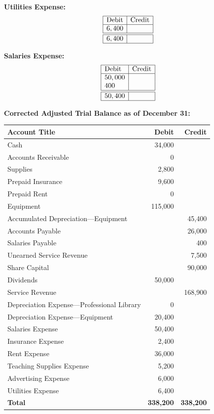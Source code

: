 \documentclass[12pt,a4paper]{book}
\begin{document}
\begin{multicols}{3}
\textbf{Utilities Expense:}
\[
\begin{array}{|l|l|}
\hline
\text{Debit} & \text{Credit} \\
\hline
6,400 & \\
\hline \hline 
6,400  & \\
\hline
\end{array}
\]

\vspace{0.5cm}

\textbf{Salaries Expense:}
\[
\begin{array}{|l|l|}
\hline
\text{Debit} & \text{Credit} \\
\hline
50,000 & \\
400 & \\
\hline \hline 
50,400 & \\
\hline
\end{array}
\]

\end{multicols} 

\textbf{Corrected Adjusted Trial Balance as of December 31:}

\begin{center}
\begin{tabular}{|l|r|r|}
\hline
\textbf{Account Title} & \textbf{Debit} & \textbf{Credit} \\
\hline
Cash & 34,000 & \\
Accounts Receivable & 0 & \\
Supplies & 2,800 & \\
Prepaid Insurance & 9,600 & \\
Prepaid Rent & 0 & \\
Equipment & 115,000 & \\
Accumulated Depreciation—Equipment & & 45,400 \\
Accounts Payable & & 26,000 \\
Salaries Payable & & 400 \\
Unearned Service Revenue & & 7,500 \\
Share Capital & & 90,000 \\
Dividends & 50,000 & \\
Service Revenue &  & 168,900 \\
Depreciation Expense—Professional Library & 0 & \\
Depreciation Expense—Equipment & 20,400 & \\
Salaries Expense & 50,400 & \\
Insurance Expense & 2,400 & \\
Rent Expense & 36,000 & \\
Teaching Supplies Expense & 5,200 & \\
Advertising Expense & 6,000 & \\
Utilities Expense & 6,400 & \\
\hline
\textbf{Total} & \textbf{338,200} & \textbf{338,200} \\
\hline
\end{tabular}
\end{center}
\end{document}

